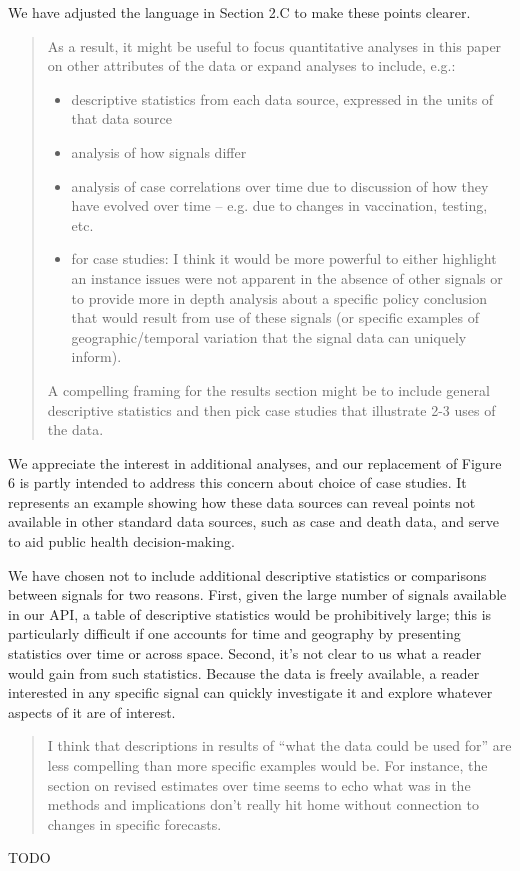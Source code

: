 \documentclass[11pt]{article}
\begin{document}
We have adjusted the language in Section 2.C to make these points clearer.

\begin{quote}
  As a result, it might be useful to focus quantitative analyses in this paper
  on other attributes of the data or expand analyses to include, e.g.:
  \begin{itemize}
  \item descriptive statistics from each data source, expressed in the units of
    that data source
  \item analysis of how signals differ
  \item analysis of case correlations over time due to discussion of how they
    have evolved over time -- e.g. due to changes in vaccination, testing, etc.
  \item for case studies: I think it would be more powerful to either highlight
    an instance issues were not apparent in the absence of other signals or to
    provide more in depth analysis about a specific policy conclusion that would
    result from use of these signals (or specific examples of
    geographic/temporal variation that the signal data can uniquely inform).
  \end{itemize}
  A compelling framing for the results section might be to include general
  descriptive statistics and then pick case studies that illustrate 2-3 uses of
  the data.
\end{quote}
We appreciate the interest in additional analyses, and our replacement of Figure
6 is partly intended to address this concern about choice of case studies. It
represents an example showing how these data sources can reveal points not
available in other standard data sources, such as case and death data, and serve
to aid public health decision-making.

We have chosen not to include additional descriptive statistics or comparisons
between signals for two reasons. First, given the large number of signals
available in our API, a table of descriptive statistics would be prohibitively
large; this is particularly difficult if one accounts for time and geography by
presenting statistics over time or across space. Second, it's not clear to us
what a reader would gain from such statistics. Because the data is freely
available, a reader interested in any specific signal can quickly investigate it
and explore whatever aspects of it are of interest.

\begin{quote}
  I think that descriptions in results of ``what the data could be used for''
  are less compelling than more specific examples would be. For instance, the
  section on revised estimates over time seems to echo what was in the methods
  and implications don't really hit home without connection to changes in
  specific forecasts.
\end{quote}
TODO
\end{document}
